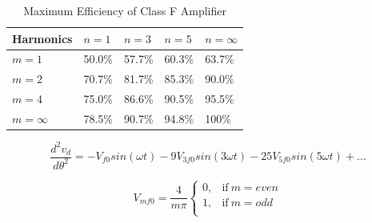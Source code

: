 \begin{table}
    \caption{Maximum Efficiency of Class F Amplifier}
    \label{table:harmonic_eff}
        \begin{center}
            \begin{tabular}{|l|l|l|l|l|}
              \hline
              Harmonics & $n = 1$ & $n =  3$ & $n = 5$ & $n = \infty$ \\ \hline
              $m = 1 $& 50.0\% & 57.7\% & 60.3\% & 63.7\% \\ \hline
              $m = 2 $& 70.7\% & 81.7\% & 85.3\% & 90.0\% \\ \hline
              $m = 4 $& 75.0\% & 86.6\% & 90.5\% & 95.5\% \\ \hline
              $m = \infty $& 78.5\% & 90.7\% & 94.8\% & 100\% \\ \hline
            \end{tabular}
        \end{center}
\end{table}

\begin{equation}\label{eq:fs_2nd_derv}
  \frac{d^2 v_d}{d \theta^2} = -V_{f0}sin(\omega t) -9V_{3f0}sin(3\omega t) - 25V_{5f0}sin(5\omega t) + \ldots
\end{equation}


\begin{equation}\label{eq:fs_squarewave}
    V_{mf0} = \frac{4}{m\pi}
    \begin{cases}
        0, & \text{if}\ m = even\\
        1, & \text{if}\ m = odd\\
    \end{cases}
\end{equation}

%

